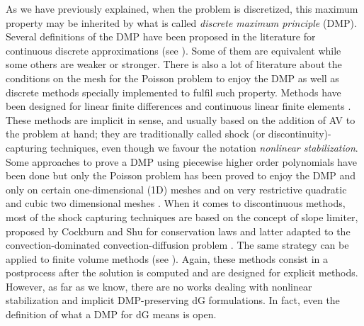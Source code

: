 As we have previously explained, when the problem is discretized, this maximum property may be inherited by what is called \textit{discrete maximum principle} (DMP). Several definitions of the DMP have been proposed in the literature for continuous discrete approximations (see \cite{codina_discontinuity-capturing_1993,hohn_remarks_1981,varga_discrete_1966,burman_edge_2004,roos_robust_2008}). Some of them are equivalent while some others are weaker or stronger. There is also a lot of literature about the conditions on the mesh for the Poisson problem to enjoy the DMP \cite{hohn_remarks_1981,vejchodsky_discrete_2007,horvath_discrete_2013,payette_performance_2012} as well as discrete methods specially implemented to fulfil such property. Methods have been designed for linear finite differences \cite{ciarlet_discrete_1970} and continuous linear finite elements \cite{ciarlet_maximum_1973,codina_discontinuity-capturing_1993,mizukami_petrov-galerkin_1985,burman_discrete_2004,burman_edge_2004,burman_stabilized_2005}. {These methods are implicit in sense, and usually based on the addition of AV to the problem at hand; they are traditionally called shock (or discontinuity)-capturing techniques, even though we favour the notation \emph{nonlinear stabilization}.} 
Some approaches to prove a DMP using piecewise higher order polynomials have been done \cite{nagarajan_enforcing_2011,payette_performance_2012,kuzmin_design_2008,vejchodsky_discrete_2007,vejchodsky_higher-order_2010,yanik_discrete_1987,yanik_sufficient_1989} but only the Poisson problem has been proved to enjoy the DMP and only on certain one-dimensional (1D) meshes \cite{vejchodsky_discrete_2007} and on very restrictive quadratic and cubic two dimensional meshes \cite{lorenz_zur_1977,hohn_remarks_1981}. When it comes to discontinuous methods, most of the shock capturing techniques are based on the concept of slope limiter, proposed by Cockburn and Shu for conservation laws \cite{cockburn_rungekutta_1998,cockburn_runge-kutta_1990} and latter adapted to the convection-dominated convection-diffusion problem  \cite{cockburn_rungekutta_2001}. The same strategy can be applied to finite volume methods (see \cite{zhang_maximum-principle-satisfying_2010,zhang_maximum-principle-satisfying_2011,zhang_maximum-principle-satisfying_2012}). Again, these methods consist in a postprocess after the solution is computed and are designed for explicit methods. {However, as far as we know, there are no works dealing with nonlinear stabilization and implicit DMP-preserving dG formulations. In fact, even the definition of what a DMP for dG means is open.}

